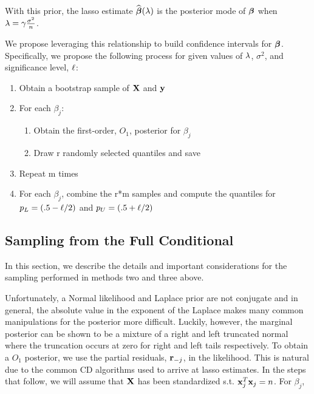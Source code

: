 With this prior, the lasso estimate $\widehat{\boldsymbol{\beta}}(\lambda)$ is the posterior mode of $\boldsymbol{\beta}$ when $\lambda = \gamma \frac{\sigma^2}{n}$.

We propose leveraging this relationship to build confidence intervals for $\boldsymbol{\beta}$. Specifically, we propose the following process for given values of $\lambda$, $\sigma^2$, and significance level, $\ell$:

\begin{enumerate}
\item Obtain a bootstrap sample of $\mathbf{X}$ and $\mathbf{y}$
\item For each $\beta_j$:
	\begin{enumerate}
	\item Obtain the first-order, $O_1$, posterior for $\beta_j$
	\item Draw r randomly selected quantiles and save
	\end{enumerate}
\item Repeat m times
\item For each $\beta_j$, combine the r*m samples and compute the quantiles for $p_L = (.5 - \ell/2)$ and $p_U = (.5 + \ell/2)$
\end{enumerate}

\subsection{Sampling from the Full Conditional}

In this section, we describe the details and important considerations for the sampling performed in methods two and three above.

Unfortunately, a Normal likelihood and Laplace prior are not conjugate and in general, the absolute value in the exponent of the Laplace makes many common manipulations for the posterior more difficult. Luckily, however, the marginal posterior can be shown to be a mixture of a right and left truncated normal where the truncation occurs at zero for right and left tails respectively. To obtain a $O_1$ posterior, we use the partial residuals, $\mathbf{r}_{-j}$, in the likelihood. This is natural due to the common CD algorithms used to arrive at lasso estimates. In the steps that follow, we will assume that $\mathbf{X}$ has been standardized s.t. $\mathbf{x}_j^T\mathbf{x}_j = n$. For $\beta_j$,

